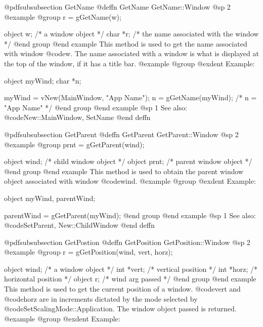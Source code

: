 @pdfsubsubsection {GetName}
@deffn {GetName} GetName::Window
@sp 2
@example
@group
r = gGetName(w);

object  w;      /*  a window object     */
char   *r;      /*  the name associated with the window   */
@end group
@end example
This method is used to get the name associated with window @code{w}.
The name associated with a window is what is displayed at the top of the
window, if it has a title bar. 
@example
@group
@exdent Example:

object  myWind;
char    *n;

myWind = vNew(MainWindow, "App Name");
n = gGetName(myWind);   /*  n = "App Name"  */
@end group
@end example
@sp 1
See also:  @code{New::MainWindow, SetName}
@end deffn














@pdfsubsubsection {GetParent}
@deffn {GetParent} GetParent::Window
@sp 2
@example
@group
prnt = gGetParent(wind);

object  wind;   /*  child window object   */
object  prnt;   /*  parent window object  */
@end group
@end example
This method is used to obtain the parent window object associated
with window @code{wind}.
@example
@group
@exdent Example:

object  myWind, parentWind;

parentWind = gGetParent(myWind);
@end group
@end example
@sp 1
See also:  @code{SetParent, New::ChildWindow}
@end deffn















@pdfsubsubsection {GetPostion}
@deffn {GetPosition} GetPosition::Window
@sp 2
@example
@group
r = gGetPosition(wind, vert, horz);

object  wind;   /*  a window object     */
int    *vert;   /*  vertical position   */
int    *horz;   /*  horizontal position */
object  r;      /*  wind arg passed     */
@end group
@end example
This method is used to get the current position of a window.
@code{vert} and @code{horz} are in increments dictated by the
mode selected by @code{SetScalingMode::Application}.  The window
object passed is returned.
@example
@group
@exdent Example:

